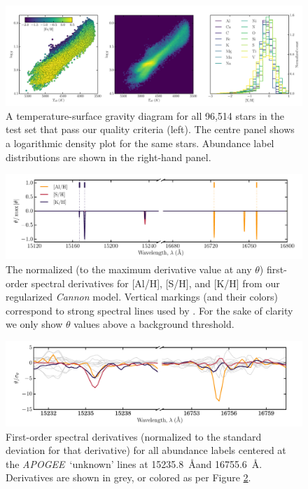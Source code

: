 \documentclass[12pt,preprint]{aastex}
\newcommand{\project}[1]{\textsl{#1}}
\newcommand{\acronym}[1]{{\small{#1}}}
\newcommand{\apogee}{\project{\acronym{APOGEE}}}
\begin{document}
\clearpage

\begin{figure}[p]
\includegraphics[width=\textwidth]{test_set_hrd.pdf}
\caption{A temperature-surface gravity diagram for all 96,514 stars in the test set that pass our quality criteria (left). The centre panel shows a logarithmic density plot for the same stars. Abundance label distributions are shown in the right-hand panel.\label{fig:test-set-hrd}}
\end{figure}

\clearpage

\begin{figure}[p]
\includegraphics[width=\textwidth]{line-identification.pdf}
\caption{The normalized (to the maximum derivative value at any $\theta$) first-order spectral derivatives for [Al/H], [S/H], and [K/H] from our regularized \emph{Cannon} model. Vertical markings (and their colors) correspond to strong spectral lines used by \citet{Smith}. For the sake of clarity we only show $\theta$ values above a background threshold.\label{fig:line-identification}}
\end{figure}

\clearpage

\begin{figure}[p]
\centering
\includegraphics[width=\textwidth]{line-identification-zoom.pdf}
\caption{First-order spectral derivatives (normalized to the standard deviation for that derivative) for all abundance labels centered at the \apogee\ `unknown' lines at 15235.8~\AA and 16755.6~\AA. Derivatives are shown in grey, or colored as per Figure \ref{fig:line-identification}.\label{fig:line-identification-2}}
\end{figure}
\end{document}
